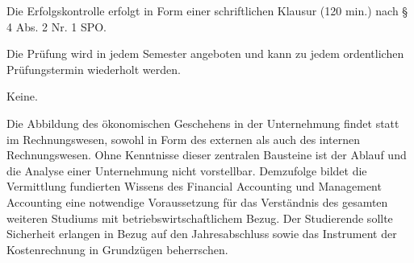 \begin{course}

\setdoclanguagegerman
{}



\coursehead


\label{cour_4301.dp_997}


\begin{styleenv}
\begin{assessment}
Die Erfolgskontrolle erfolgt in Form einer schriftlichen Klausur (120 min.) nach § 4 Abs. 2 Nr. 1 SPO.

 

Die Prüfung wird in jedem Semester angeboten und kann zu jedem ordentlichen Prüfungstermin wiederholt werden.


\end{assessment}

\begin{conditions}Keine.\end{conditions}


\end{styleenv}

\begin{learningoutcomes}
Die Abbildung des ökonomischen Geschehens in der Unternehmung findet statt im Rechnungswesen, sowohl in Form des externen als auch des internen Rechnungswesen. Ohne Kenntnisse dieser zentralen Bausteine ist der Ablauf und die Analyse einer Unternehmung nicht vorstellbar. Demzufolge bildet die Vermittlung fundierten Wissens des Financial Accounting und Management Accounting eine notwendige Voraussetzung für das Verständnis des gesamten weiteren Studiums mit betriebswirtschaftlichem Bezug. Der Studierende sollte Sicherheit erlangen in Bezug auf den Jahresabschluss sowie das Instrument der Kostenrechnung in Grundzügen beherrschen.


\end{learningoutcomes}


\end{course}
